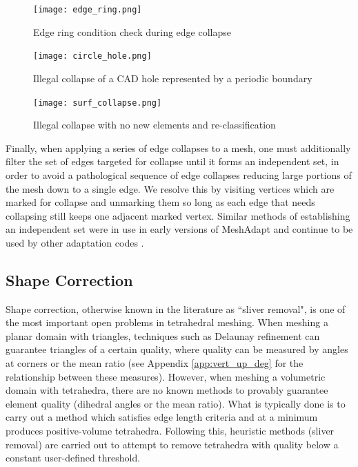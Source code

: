 \begin{figure}
\begin{center}
\texttt{[image: edge\_ring.png]}
\caption{Edge ring condition check during edge collapse}
\label{fig:edge_ring}
\end{center}
\end{figure}

\begin{figure}
\begin{center}
\texttt{[image: circle\_hole.png]}
\caption{Illegal collapse of a CAD hole represented by a periodic boundary}
\label{fig:circle_hole}
\end{center}
\end{figure}

\begin{figure}
\begin{center}
\texttt{[image: surf\_collapse.png]}
\caption{Illegal collapse with no new elements and re-classification}
\label{fig:surf_collapse}
\end{center}
\end{figure}

Finally, when applying a series of edge collapses to a mesh, one
must additionally filter the set of edges targeted for collapse
until it forms an independent set, in order to avoid a pathological
sequence of edge collapses reducing large portions of the mesh
down to a single edge.
We resolve this by visiting vertices which are marked for collapse
and unmarking them so long as each edge that needs collapsing
still keeps one adjacent marked vertex.
Similar methods of establishing an independent set were
in use in early versions of MeshAdapt \cite{de1999parallel}
and continue to be used by other adaptation codes
\cite{michal2012anisotropic}.

\subsection{Shape Correction}
\label{sec:ma_shape}

Shape correction, otherwise known in the literature as ``sliver removal",
is one of the most important open problems in tetrahedral meshing.
When meshing a planar domain with triangles, techniques such as
Delaunay refinement can guarantee triangles of a certain quality,
where quality can be measured by angles at corners or the
mean ratio (see Appendix \ref{app:vert_up_deg} for the relationship
between these measures).
However, when meshing a volumetric domain with tetrahedra, there
are no known methods to provably guarantee element quality (dihedral angles
or the mean ratio).
What is typically done is to carry out a method which satisfies
edge length criteria and at a minimum produces positive-volume
tetrahedra.
Following this, heuristic methods (sliver removal) are carried out
to attempt to remove tetrahedra with quality below a constant user-defined
threshold.

